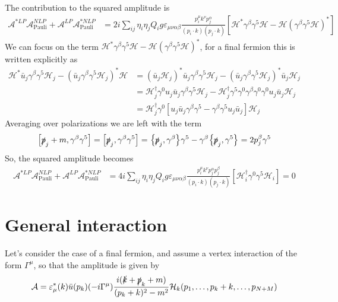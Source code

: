 \documentclass{article}
\newcommand{\s}[1]{\slashed #1}
\begin{document}
The contribution to the squared amplitude is
\begin{align*}
	\mathcal{A}^{*LP}\mathcal{A}_{\mathrm{Pauli}}^{NLP}+\mathcal{A}^{LP}\mathcal{A}_{\mathrm{Pauli}}^{*NLP} &
	= 2i\sum_{ij}\eta_i\eta_j Q_i g\varepsilon_{\mu\nu\alpha\beta} \frac{p_{i}^\mu k^\nu p_j^\alpha}{(p_i\cdot k)(p_j\cdot k)}\left[\mathcal{H}^*\gamma^\beta \gamma^5\mathcal{H}-\mathcal{H}(\gamma^\beta \gamma^5\mathcal{H})^*\right]
\end{align*}
We can focus on the term $\mathcal{H}^*\gamma^\beta \gamma^5\mathcal{H}-\mathcal{H}(\gamma^\beta \gamma^5\mathcal{H})^*$, for a final fermion this is written explicitly as
\begin{align*}
	\mathcal{H}^*\bar{u}_j\gamma^\beta \gamma^5\mathcal{H}_j-(\bar{u}_j\gamma^\beta \gamma^5\mathcal{H}_j)^* \mathcal{H}&
	=(\bar{u}_j\mathcal{H}_j)^*\bar{u}_j\gamma^\beta \gamma^5\mathcal{H}_j-(\bar{u}_j\gamma^\beta \gamma^5\mathcal{H}_j)^* \bar{u}_j\mathcal{H}_j\\&
	=\mathcal{H}^\dag_j\gamma^0u_j\bar{u}_j\gamma^\beta \gamma^5\mathcal{H}_j-\mathcal{H}^\dag_j\gamma^5 \gamma^0 \gamma^\beta \gamma^0\gamma^0 u_j\bar{u}_j\mathcal{H}_j\\&
	=\mathcal{H}^\dag_j\gamma^0\left[u_j\bar{u}_j\gamma^\beta \gamma^5 - \gamma^\beta \gamma^5 u_j\bar{u}_j\right]\mathcal{H}_j
\end{align*}
Averaging over polarizations we are left with the term
\begin{equation}
	\comm{\s{p}_j+m}{\gamma^\beta \gamma^5} = \comm{\s{p}_j}{\gamma^\beta \gamma^5} = \acomm{\s{p}_j}{\gamma^\beta}\gamma^5-\gamma^\beta\acomm{\s{p}_j}{\gamma^5}=2p_j^\beta \gamma^5
\end{equation}
So, the squared amplitude becomes
\begin{align*}
	\mathcal{A}^{*LP}\mathcal{A}_{\mathrm{Pauli}}^{NLP}+\mathcal{A}^{LP}\mathcal{A}_{\mathrm{Pauli}}^{*NLP} &
	= 4i\sum_{ij}\eta_i\eta_j Q_i g\varepsilon_{\mu\nu\alpha\beta} \frac{p_{i}^\mu k^\nu p_j^\alpha p_j^\beta}{(p_i\cdot k)(p_j\cdot k)}\left[\mathcal{H}^\dag_i\gamma^0 \gamma^5\mathcal{H}_i\right] = 0
\end{align*}

\section{General interaction}

Let's consider the case of a final fermion, and assume a vertex interaction of the form $\Gamma^\mu$, so that the amplitude is given by
\begin{equation}
	\mathcal{A} = \varepsilon^*_\mu(k)\bar{u}(p_k)(-i\Gamma^\mu)\frac{i(\s{k} + \s{p}_k + m)}{(p_k + k)^2 - m^2} \mathcal{H}_k(p_1, \ldots, p_k+k, \ldots, p_{N+M})
\end{equation}
\end{document}
